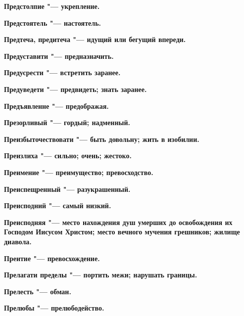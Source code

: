 \bfseries Предстолпие \normalfont{} "--- укрепление. 




\bfseries Предстоятель \normalfont{} "--- настоятель. 




\bfseries Предтеча, предитеча \normalfont{} "--- идущий или бегущий впереди. 




\bfseries Предуставити \normalfont{} "--- предназначить. 




\bfseries Предусрести \normalfont{} "--- встретить заранее. 




\bfseries Предуведети \normalfont{} "--- предвидеть; знать заранее. 




\bfseries Предъявленне \normalfont{} "--- предображая. 




\bfseries Презорливый \normalfont{} "--- гордый; надменный. 




\bfseries Преизбыточествовати \normalfont{} "--- быть довольну; жить в изобилии. 




\bfseries Преизлиха \normalfont{} "--- сильно; очень; жестоко. 




\bfseries Преимение \normalfont{} "--- преимущество; превосходство. 




\bfseries Преиспещренный \normalfont{} "--- разукрашенный. 




\bfseries Преисподний \normalfont{} "--- самый низкий. 




\bfseries Преисподняя \normalfont{} "--- место нахождения душ умерших до освобождения их Господом Иисусом Христом; место вечного мучения грешников; жилище диавола. 




\bfseries Преитие \normalfont{} "--- превосхождение. 




\bfseries Прелагати пределы \normalfont{} "--- портить межи; нарушать границы. 




\bfseries Прелесть \normalfont{} "--- обман. 




\bfseries Прелюбы \normalfont{} "--- прелюбодейство. 




